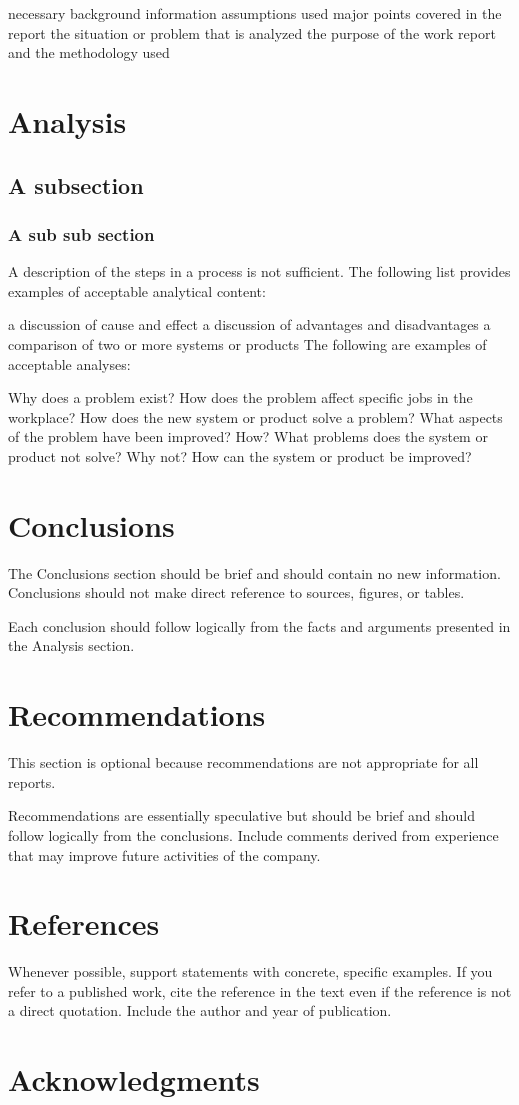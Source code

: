 \documentclass{article}
\begin{document}
necessary background information
assumptions used
major points covered in the report
the situation or problem that is analyzed
the purpose of the work report and the methodology used

\section{Analysis} 
\subsection{A subsection}
\subsubsection{A sub sub section}
A description of the steps in a process is not sufficient. The following list provides examples of acceptable analytical content:

a discussion of cause and effect
a discussion of advantages and disadvantages
a comparison of two or more systems or products
The following are examples of acceptable analyses:

Why does a problem exist?
How does the problem affect specific jobs in the workplace?
How does the new system or product solve a problem?
What aspects of the problem have been improved? How?
What problems does the system or product not solve? Why not?
How can the system or product be improved?

\section{Conclusions}
The Conclusions section should be brief and should contain no new information. Conclusions should not make direct reference to sources, figures, or tables.

Each conclusion should follow logically from the facts and arguments presented in the Analysis section.

\section{Recommendations}
This section is optional because recommendations are not appropriate for all reports.

Recommendations are essentially speculative but should be brief and should follow logically from the conclusions. Include comments derived from experience that may improve future activities of the company.

\newpage
{}
\section*{References}
Whenever possible, support statements with concrete, specific examples. If you refer to a published work, cite the reference in the text even if the reference is not a direct quotation. Include the author and year of publication.

\newpage
{}
\section*{Acknowledgments}
\end{document}
